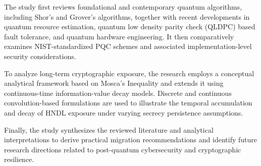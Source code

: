 \documentclass[11pt,a4paper]{article}
\begin{document}
The study first reviews foundational and contemporary quantum algorithms, including Shor’s and Grover’s algorithms, together with recent developments in quantum resource estimation, quantum low density parity check (QLDPC) based fault tolerance, and quantum hardware engineering. It then comparatively examines NIST-standardized PQC schemes and associated implementation-level security considerations.

To analyze long-term cryptographic exposure, the research employs a conceptual analytical framework based on Mosca’s Inequality and extends it using continuous-time information-value decay models. Discrete and continuous convolution-based formulations are used to illustrate the temporal accumulation and decay of HNDL exposure under varying secrecy persistence assumptions.

Finally, the study synthesizes the reviewed literature and analytical interpretations to derive practical migration recommendations and identify future research directions related to post-quantum cybersecurity and cryptographic resilience.
\end{document}
